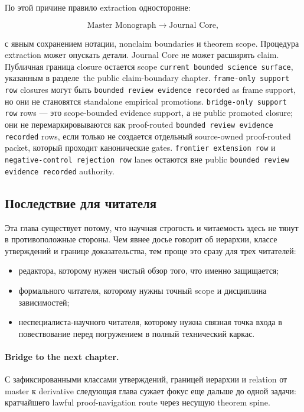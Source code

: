 По этой причине правило extraction односторонне:

\[
\text{Master Monograph} \longrightarrow \text{Journal Core},
\]

с явным сохранением нотации, nonclaim boundaries и theorem scope.
Процедура extraction может опускать детали.
Journal Core не может расширять claim.
Публичная граница closure остается scope
\texttt{current bounded science surface}, указанным в
разделе~the public claim-boundary chapter. \texttt{frame-only support row}
closures могут быть \texttt{bounded review evidence recorded} as frame support, но они не становятся
standalone empirical promotions. \texttt{bridge-only support row} rows — это
scope-bounded evidence support, а не public promoted closure; они не
перемаркировываются как proof-routed \texttt{bounded review evidence recorded} rows, если только не
создается отдельный source-owned proof-routed packet, который проходит
канонические gates. \texttt{frontier extension row} и \texttt{negative-control rejection row} lanes остаются
вне public \texttt{bounded review evidence recorded} authority.

\subsection{Последствие для читателя}

Эта глава существует потому, что научная строгость и читаемость здесь не
тянут в противоположные стороны.
Чем явнее досье говорит об иерархии, классе утверждений и границе
доказательства, тем проще это сразу для трех читателей:

\begin{itemize}
\item редактора, которому нужен чистый обзор того, что именно защищается;
\item формального читателя, которому нужны точный scope и дисциплина
      зависимостей;
\item неспециалиста-научного читателя, которому нужна связная точка входа в
      повествование перед погружением в полный технический каркас.
\end{itemize}

\paragraph{Bridge to the next chapter.}
С зафиксированными классами утверждений, границей иерархии и relation от
master к derivative следующая глава сужает фокус еще дальше до одной задачи:
кратчайшего lawful proof-navigation route через несущую theorem spine.

\clearpage
